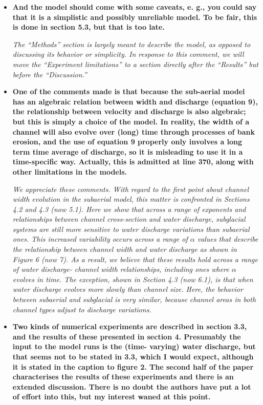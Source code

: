 \documentclass[11pt]{article}
\begin{document}
\begin{itemize}
\item  \textbf{And the model should come with some caveats, e. g., you could say that it is a simplistic and possibly unreliable model. To be fair, this is done in section 5.3, but that is too late.}

  \textit{The ``Methods'' section is largely meant to describe the model, as opposed to discussing its behavior or simplicity. In response to this comment, we will move the ``Experiment limitations'' to a section directly after the ``Results'' but before the ``Discussion.''}

  
\item \textbf{  One of the comments made is that because the sub-aerial model has an algebraic relation between width and discharge (equation 9), the relationship between velocity and discharge is also algebraic; but this is simply a choice of the model. In reality, the width of a channel will also evolve over (long) time through processes of bank erosion, and the use of equation 9 properly only involves a long term time average of discharge, so it is misleading to use it in a time-specific way. Actually, this is admitted at line 370, along with other limitations in the models.}


  \textit{We appreciate these comments. With regard to the first point about channel width evolution in the subaerial model, this matter is confronted in Sections 4.2 and 4.3 (now 5.1).
    Here we show that across a range of exponents and relationships between channel cross-section and water discharge, subglacial systems are still more sensitive to water discharge variations than subaerial ones.
    This increased variability occurs across a range of $\alpha$ values that describe the relationship between channel width and water discharge as shown in Figure 6 (now 7).
    As a result, we believe that these results hold across a range of water discharge- channel width relationships, including ones where $\alpha$ evolves in time.
    The exception, shown in Section 4.3 (now 6.1), is that when water discharge evolves more slowly than channel size. Here, the behavior between subaerial and subglacial is very similar, because channel areas in both channel types adjust to discharge variations.}
  

\item   \textbf{Two kinds of numerical experiments are described in section 3.3, and the results of these presented in section 4. Presumably the input to the model runs is the (time- varying) water discharge, but that seems not to be stated in 3.3, which I would expect, although it is stated in the caption to figure 2.
    The second half of the paper characterises the results of these experiments and there is an extended discussion. There is no doubt the authors have put a lot of effort into this, but my interest waned at this point.}
 

\end{itemize}
\end{document}
